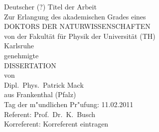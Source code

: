 
\begin{titlepage}
\vspace*{2.0cm}
\begin{center}
{\LARGE \color{red} Deutscher (?) Titel der Arbeit}\\[1.5cm]
Zur Erlangung des akademischen Grades eines\\[1cm]
{\Large DOKTORS DER NATURWISSENSCHAFTEN}\\[1cm]
von der Fakult\"at f\"ur Physik der Universit\"at (TH)\\
Karlsruhe\\[0.5cm]
genehmigte\\[0.5cm]
{\Large DISSERTATION}\\[0.5cm]
von\\[0.5cm]
{\color{red} Dipl.~Phys.~Patrick Mack}\\
{\color{red} aus Frankenthal (Pfalz)}\\[0.5cm]
\vspace{\fill}
Tag der m"undlichen Pr"ufung: {\color{red} 11.02.2011}\\
Referent: {\color{red} Prof.~Dr.~K.~Busch}\\
Korreferent: {\color{red} Korreferent eintragen}
\end{center}
\end{titlepage}
\thispagestyle{empty}
\cleardoublepage

